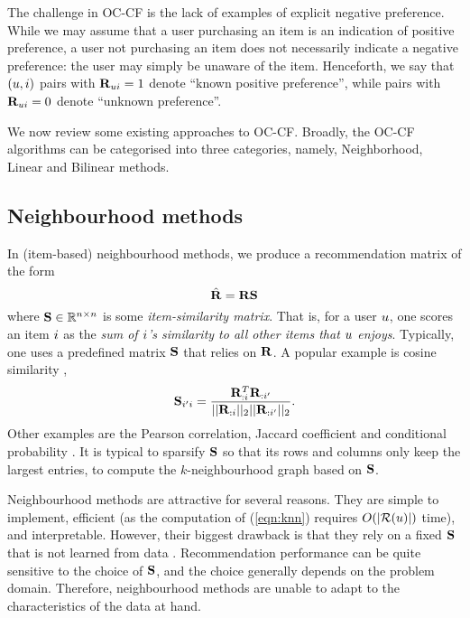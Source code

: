 The challenge in OC-CF is the lack of examples of explicit negative preference.
While we may assume that a user purchasing an item is an indication of positive preference, a user not purchasing an item does not necessarily indicate a negative preference: the user may simply be unaware of the item.
Henceforth, we say that $(u, i)$ pairs with $\mathbf{R}_{ui} = 1$ denote ``known positive preference'', while pairs with $\mathbf{R}_{ui} = 0$ denote ``unknown preference''.

We now review some existing approaches to OC-CF. Broadly, the OC-CF algorithms can be categorised into three categories, namely, Neighborhood, Linear and Bilinear methods.

%
\subsection{Neighbourhood methods}
\label{sec:knn}

In (item-based) neighbourhood methods, we produce a recommendation matrix of the form
\begin{equation}
\label{eqn:knn}
\hat{\mathbf{R}} = \mathbf{R} \mathbf{S}
\end{equation}
where $\mathbf{S} \in \mathbb{R}^{n \times n}$ is some \emph{item-similarity matrix}.
That is, for a user $u$, one scores an item $i$ as the \emph{sum of $i$'s similarity to all other items that $u$ enjoys}.
Typically, one uses a predefined matrix $\mathbf{S}$ that relies on $\mathbf{R}$. A popular example is cosine similarity \citep{Sarwar:2001, Linden:2003},
$$ \mathbf{S}_{i' i} = \frac{ \mathbf{R}_{:i}^T \mathbf{R}_{:i'} }{|| \mathbf{R}_{:i} ||_2 || \mathbf{R}_{:i'} ||_2}. $$
Other examples are the Pearson correlation, Jaccard coefficient and conditional probability \citep{Deshpande:2004}. It is typical to sparsify $\mathbf{S}$ so that its rows and columns only keep the largest entries, \ie to compute the $k$-neighbourhood graph based on $\mathbf{S}$.

Neighbourhood methods are attractive for several reasons.
They are simple to implement, efficient (as the computation of (\ref{eqn:knn}) requires $O( | \mathcal{R}(u) | )$ time), and interpretable.
However, their biggest drawback is that they rely on a fixed $\mathbf{S}$ that is not learned from data \citep{Koren:2008b}.
Recommendation performance can be quite sensitive to the choice of $\mathbf{S}$, and the choice generally depends on the problem domain.
Therefore, neighbourhood methods are unable to adapt to the characteristics of the data at hand.


